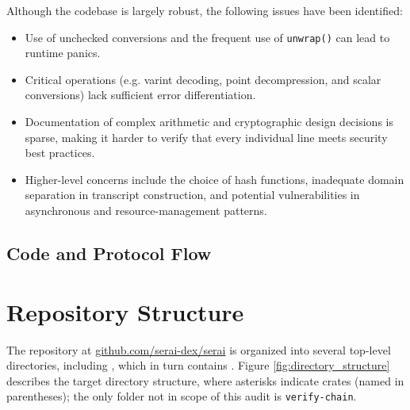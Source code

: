\documentclass[12pt,a4paper]{article}
\begin{document}
Although the codebase is largely robust, the following issues have been identified:
\begin{itemize}
    \item Use of unchecked conversions and the frequent use of \texttt{unwrap()} can lead to runtime panics.
    \item Critical operations (e.g. varint decoding, point decompression, and scalar conversions) lack sufficient error differentiation.
    \item Documentation of complex arithmetic and cryptographic design decisions is sparse, making it harder to verify that every individual line meets security best practices.
    \item Higher-level concerns include the choice of hash functions, inadequate domain separation in transcript construction, and potential vulnerabilities in asynchronous and resource-management patterns.
\end{itemize}

\subsection{Code and Protocol Flow}

\section{Repository Structure}



The repository at \url{github.com/serai-dex/serai} is organized into several top-level directories, including , which in turn contains .  Figure \ref{fig:directory_structure} describes the target directory structure, where asterisks indicate crates (named in parentheses); the only folder not in scope of this audit is \texttt{verify-chain}. 
\end{document}
